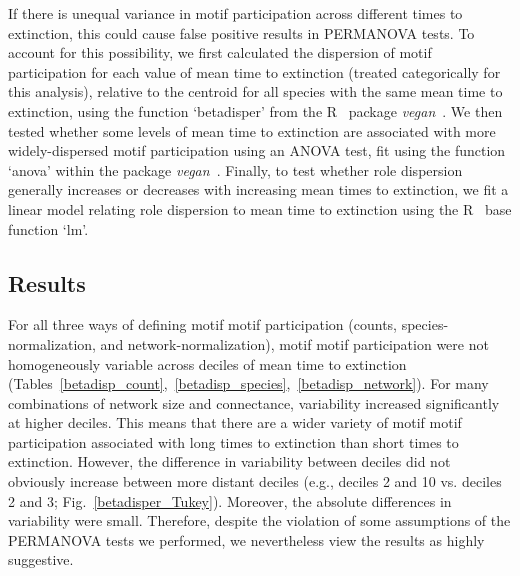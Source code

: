 \documentclass[12pt]{article}
\begin{document}
\begin{spacing}{2.0}
        If there is unequal variance in motif participation across different times to extinction, this could cause false positive results in PERMANOVA tests.
        To account for this possibility, we first calculated the dispersion of motif participation for each value of mean time to extinction (treated categorically for this analysis), relative to the centroid for all species with the same mean time to extinction, using the function `betadisper' from the R~\citep{R} package \emph{vegan}~\citep{vegan}.
        We then tested whether some levels of mean time to extinction are associated with more widely-dispersed motif participation using an ANOVA test, fit using the function `anova' within the package \emph{vegan}~\citep{vegan}.
        Finally, to test whether role dispersion generally increases or decreases with increasing mean times to extinction, we fit a linear model relating role dispersion to mean time to extinction using the R~\citep{R} base function `lm'.


	\subsection*{Results}

        For all three ways of defining motif motif participation (counts, species-normalization, and network-normalization), motif motif participation were not homogeneously variable across deciles of mean time to extinction (Tables~\ref{betadisp_count},~\ref{betadisp_species},~\ref{betadisp_network}). 
        For many combinations of network size and connectance, variability increased significantly at higher deciles.
        This means that there are a wider variety of motif motif participation associated with long times to extinction than short times to extinction.
        However, the difference in variability between deciles did not obviously increase between more distant deciles (e.g., deciles 2 and 10 vs. deciles 2 and 3; Fig.~\ref{betadisper_Tukey}).
        Moreover, the absolute differences in variability were small.
        Therefore, despite the violation of some assumptions of the PERMANOVA tests we performed, we nevertheless view the results as highly suggestive.
        


\end{spacing}
\end{document}
